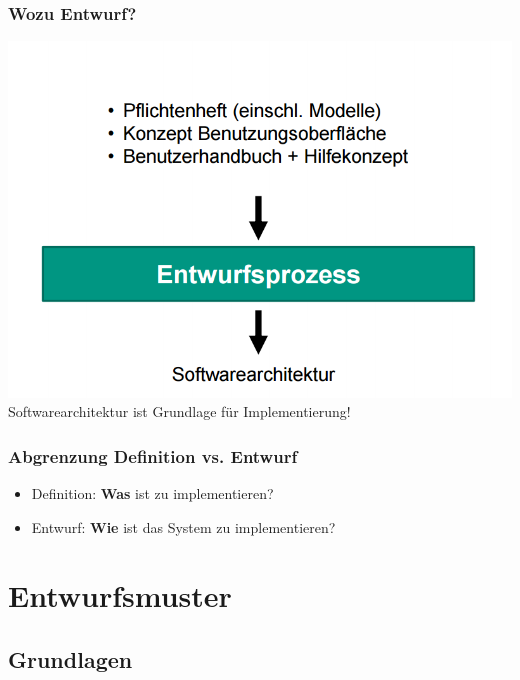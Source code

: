 \documentclass[18pt]{beamer}
\begin{document}
		\begin{frame}
			\frametitle{Wozu Entwurf?}
			\centering
			\includegraphics[scale=0.4]{./pics/tut3/design.png} \linebreak
			Softwarearchitektur ist Grundlage für Implementierung!
		\end{frame}
	
		\begin{frame}
			\frametitle{Abgrenzung Definition vs. Entwurf}
			\begin{itemize}
				\item Definition: \textbf{Was} ist zu implementieren?
				\pause
				\item Entwurf: \textbf{Wie} ist das System zu implementieren?
			\end{itemize}
		\end{frame}
	
\section{Entwurfsmuster}
	\subsection{Grundlagen}
	
\end{document}
